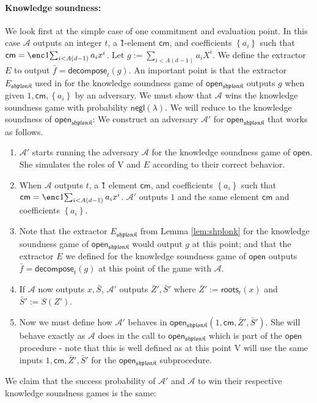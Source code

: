 \documentclass[11pt]{article} %
\newcommand{\F}{\ensuremath{\mathbb F}\xspace}
\newcommand{\adv}{\ensuremath{\mathcal A}\xspace}
\newcommand{\advprime}{\ensuremath{{\mathcal A}'}\xspace}
\newcommand{\cm}{\ensuremath{\mathsf{cm}}\xspace}
\newcommand{\open}{\ensuremath{\mathsf{open}}\xspace}
\newcommand{\negl}{\ensuremath{\mathsf{negl}(\lambda)}\xspace}
\newcommand{\acc}{\ensuremath{\mathsf{acc}}\xspace}
\newcommand{\defeq}{:=}
\newcommand{\verpc}{\ensuremath{\mathrm{V}}\xspace}%
\newcommand{\ext}{\ensuremath{E}\xspace}
\newcommand{\shplonk}{\ensuremath{\mathfrak{sh}\mathfrak{p}\mathfrak{lon}\mathfrak{K}}\xspace}
\newcommand{\extshplonk}{\ensuremath{E_{\shplonk}}\xspace}
\newcommand{\set}[1]{\ensuremath{\left\{#1\right\}}\xspace}
\newcommand{\Z}{\mathbb{Z}}
\newcommand{\decompose}[2]{\ensuremath{\mathsf{decompose}_{#1}(#2)}\xspace}
\newcommand{\roots}[2]{\ensuremath{\mathsf{roots}_{#1}(#2)}\xspace}
\newcommand{\f}{\ensuremath{\bar{f}}\xspace}
\renewcommand{\S}{\ensuremath{\bar{S}}\xspace}
\renewcommand{\Z}{\ensuremath{\bar{Z}}\xspace}
\newcommand{\prg}[1]{ \paragraph{\textbf{#1}}}
\newcommand{\sumi}[1]{\sum_{i<#1}}
\newcommand{\openshplonk}{\ensuremath{\mathsf{open_{\shplonk}}}\xspace}
\begin{document}
 \prg{Knowledge soundness:}
 We look first at the simple case of one commitment and evaluation point.
In this case \adv outputs an integer $t$, a \G1-element \cm, and coefficients \set{a_i} such that
$\cm=\enc1{\sumi{A(d-1)} a_i x^i}$.
 Let $g\defeq \sumi{A(d-1)} a_i X^i$.  
 We define the extractor \ext to output
 $\f = \decompose{t}{g}$.
 An important point is that the extractor \extshplonk used in \cite{shplonk} for the knowledge soundness game 
 of \openshplonk outputs $g$ when given $1,\cm,\set{a_i}$ by an adversary.
 We must show that \adv wins the knowledge soundness game with probability \negl.
% 
 We will reduce to the knowledge soundness of \openshplonk:
 We construct an adversary \advprime for \openshplonk that works as follows.
 \begin{enumerate}
 \item \advprime starts running the adversary \adv for the knowledge soundness game of \open. She simulates the roles of 
 \verpc and \ext according to their correct behavior.
  \item 
When \adv outputs $t$, a \G1 element \cm, and coefficients \set{a_i}
such that $\cm=\enc1{\sumi{A(d-1)} a_i x^i}$.
\advprime outputs $1$ and the same element \cm and coefficients \set{a_i}.
\item 
Note that the extractor \extshplonk from Lemma \ref{lem:shplonk} for the knowledge soundness game 
 of \openshplonk would output $g$ at this point; and that the extractor \ext we defined for the knowledge soundness game of \open outputs $\f=\decompose{t}{g}$ at this point of the game with \adv.
\item
 If \adv now outputs $x,\S$, \advprime outputs $\Z',\S'$ where $\Z'\defeq \roots{t}{x}$ and $\S'\defeq S(Z')$.
 \item Now we must define how \advprime behaves in $\openshplonk(1,\cm,\Z',\S')$. She will behave exactly as \adv does in the call to \openshplonk which is part of the \open procedure - note that this is well defined as at this point \verpc will use the same inputs $1,\cm,\Z',\S'$ for the \openshplonk subprocedure.
 \end{enumerate}
We claim that the success probability of \advprime and \adv to win their respective knowledge soundness games is the same:
\end{document}
